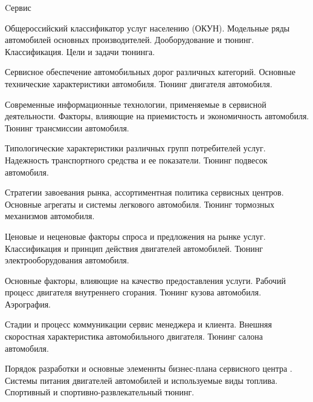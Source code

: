 \documentclass[
	11pt,
	a4paper,
	]
	{article}
\begin{document}
 {Cервис}

	

\noindent{} 
	{
		Общероссийский классификатор услуг населению (ОКУН).
	}{
		Модельные ряды автомобилей основных производителей.
	}{
		Дооборудование и тюнинг. Классификация. Цели и задачи тюнинга.
	}

\bigskip

\noindent{} 
	{
		Сервисное обеспечение автомобильных дорог различных категорий.
	}{
		Основные технические характеристики автомобиля.
	}{
		Тюнинг двигателя автомобиля.
	}

\bigskip

\noindent{} 
	{
		Современные информационные технологии, применяемые в сервисной деятельности.
	}{
		Факторы, влияющие на приемистость и экономичность автомобиля.
	}{
		Тюнинг трансмиссии автомобиля.
	}

\bigskip

\noindent{} 
	{
		Типологические характеристики различных групп потребителей услуг.
	}{
		Надежность транспортного средства и ее показатели.
	}{
		Тюнинг подвесок автомобиля.
	}

\bigskip

\noindent{} 
	{
		Стратегии завоевания рынка, ассортиментная политика сервисных центров.
	}{
		Основные агрегаты и системы легкового автомобиля.
	}{
		Тюнинг тормозных механизмов автомобиля.
	}

\bigskip

\noindent{} 
	{
		Ценовые и неценовые факторы спроса и предложения на рынке услуг.
	}{
		Классификация и принцип действия двигателей автомобилей.
	}{
		Тюнинг электрооборудования автомобиля.
	}

\bigskip

\noindent{} 
	{
		Основные факторы, влияющие на качество предоставления услуги.
	}{
		Рабочий процесс двигателя внутреннего сгорания.
	}{
		Тюнинг кузова автомобиля. Аэрография.
	}

\bigskip

\noindent{} 
	{
		Стадии и процесс коммуникации сервис менеджера и клиента.
	}{
		Внешняя скоростная характеристика автомобильного двигателя.
	}{
		Тюнинг салона автомобиля.
	}

\bigskip

\noindent{} 
	{
		Порядок разработки и основные элеменнты бизнес-плана сервисного центра .
	}{
		Системы питания двигателей автомобилей и используемые виды топлива.
	}{
		Спортивный и спортивно-развлекательный тюнинг.
	}
\end{document}
